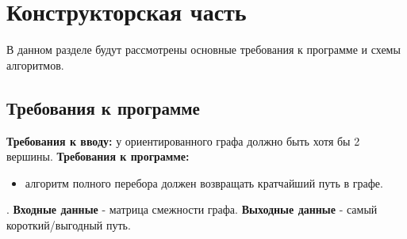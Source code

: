 \documentclass[12pt]{report}
\begin{document}
\chapter{Конструкторская часть}
В данном разделе будут рассмотрены основные требования к программе и схемы алгоритмов.

\section{Требования к программе}
\textbf{Требования к вводу:}
у ориентированного графа должно быть хотя бы 2 вершины.
\newline
\textbf{Требования к программе:}
\begin{itemize}
	\item алгоритм полного перебора должен возвращать кратчайший путь в графе.
\end{itemize}
.  
\newline  
\textbf{Входные данные} - матрица смежности графа.  
\newline
\textbf{Выходные данные} - самый короткий/выгодный путь.
\end{document}
